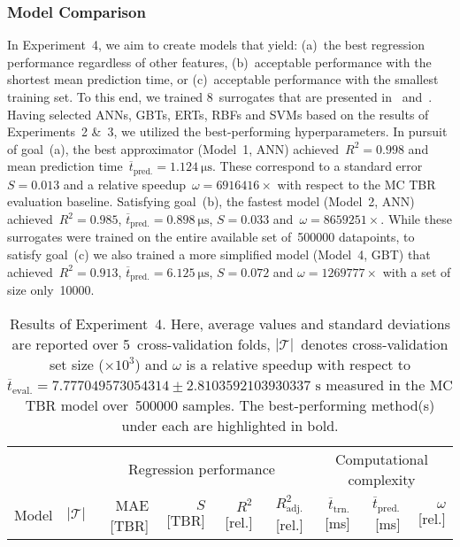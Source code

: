 \subsubsection{Model Comparison}
\label{sec:res-exp4}

In Experiment~4, we aim to create models that yield:
(a)~the best regression performance regardless
of other features, (b)~acceptable performance with the shortest mean
prediction time, or (c)~acceptable performance with the smallest training set.
To this end, we trained 8~surrogates that are presented in~
and~.
Having selected ANNs, GBTs, ERTs, RBFs and SVMs based on the results of
Experiments~2 \&~3, we utilized the best-performing hyperparameters.
In pursuit of goal~(a), the best approximator (Model~1,
ANN) achieved~$R^2=\num{0.998}$ and mean prediction
time~$\overline{t}_{\text{pred.}}=\SI{1.124}{\micro\second}$. These correspond
to a standard error~$S=\num{0.013}$ and a relative speedup~$\omega=\num{6916416} \times$
with respect to the MC TBR evaluation baseline. Satisfying
goal~(b), the fastest model (Model~2, ANN) achieved~$R^2=\num{0.985}$,
$\overline{t}_{\text{pred.}}=\SI{0.898}{\micro\second}$, $S=\num{0.033}$
and~$\omega=\num{8659251} \times$.
While these surrogates
were trained on the entire available set of~\num{500000} datapoints, to satisfy
goal~(c) we also trained a more simplified model (Model~4, GBT)
that achieved~$R^2=\num{0.913}$,
$\overline{t}_{\text{pred.}}=\SI{6.125}{\micro\second}$, $S=\num{0.072}$ and $\omega=\num{1269777} \times$
with a set of size only~\num{10000}.

\begin{table*}
	\centering
	\caption{\label{tbl:exp4-detailed-results}Results of Experiment~4. Here,
		average values and standard deviations are reported over 5~cross-validation folds,
		$|\mathcal{T}|$~denotes cross-validation set size ($\times 10^3$)
		and $\omega$ is a relative speedup with respect to
		$\overline{t}_{\text{eval.}}=\num{7.777049573054314} \pm
		\num{2.8103592103930337} \text{ s}$
		measured in the MC TBR model over~\num{500000} samples.
	The best-performing method(s) under each are highlighted in bold.}
	\setlength\tabcolsep{4pt}
	\renewcommand{\arraystretch}{0.95}
	\begin{indented}
	\item[]
		\scriptsize
		\begin{tabular}{lrrrrrrrr}
		\toprule
		{} & {} & \multicolumn{4}{c}{Regression performance} &
		\multicolumn{3}{c}{Computational complexity}\\
		\cmidrule(lr){3-6}
		\cmidrule(lr){7-9}
		Model & $|\mathcal{T}|$ & MAE [TBR] & $S$ [TBR] & $R^2$ [rel.] & $R^2_{\text{adj.}}$ [rel.]
						& $\overline{t}_{\text{trn.}}$ [\si{\milli\second}] &
		$\overline{t}_{\text{pred.}}$ [\si{\milli\second}] & $\omega$ [rel.]\\
		\midrule
		
		\bottomrule
		\end{tabular}
	\end{indented}
\end{table*}


